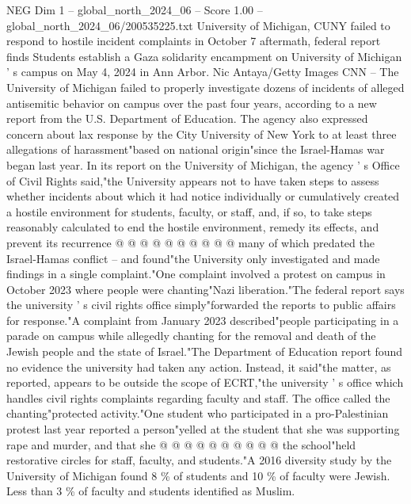 \begin{textsample}{NEG Dim 1 – global\_north\_2024\_06 – Score 1.00 – global\_north\_2024\_06/200535225.txt}  \label{ex:f1_neg_211}
University of Michigan, CUNY failed to respond to hostile incident complaints in October 7 aftermath, federal report finds Students establish a Gaza solidarity encampment on University of Michigan ' s campus on May 4, 2024 in Ann Arbor.
Nic Antaya/Getty Images CNN -- The University of Michigan failed to properly investigate dozens of incidents of alleged antisemitic behavior on campus over the past four years, according to a new report from the U.S.
Department of Education.
The agency also expressed concern about lax response by the City University of New York to at least three allegations of harassment"based on national origin"since the Israel-Hamas war began last year.
In its report on the University of Michigan, the agency ' s Office of Civil Rights said,"the University appears not to have taken steps to assess whether incidents about which it had notice individually or cumulatively created a hostile environment for students, faculty, or staff, and, if so, to take steps reasonably calculated to end the hostile environment, remedy its effects, and prevent its recurrence @ @ @ @ @ @ @ @ @ @ many of which predated the Israel-Hamas conflict -- and found"the University only investigated and made findings in a single complaint."One complaint involved a protest on campus in October 2023 where people were chanting"Nazi liberation."The federal report says the university ' s civil rights office simply"forwarded the reports to public affairs for response."A complaint from January 2023 described"people participating in a parade on campus while allegedly chanting for the removal and death of the Jewish people and the state of Israel."The Department of Education report found no evidence the university had taken any action.
Instead, it said"the matter, as reported, appears to be outside the scope of ECRT,"the university ' s office which handles civil rights complaints regarding faculty and staff.
The office called the chanting"protected activity."One student who participated in a pro-Palestinian protest last year reported a person"yelled at the student that she was supporting rape and murder, and that she @ @ @ @ @ @ @ @ @ @ the school"held restorative circles for staff, faculty, and students."A 2016 diversity study by the University of Michigan found 8 \% of students and 10 \% of faculty were Jewish.
Less than 3 \% of faculty and students identified as Muslim.

\end{textsample}
